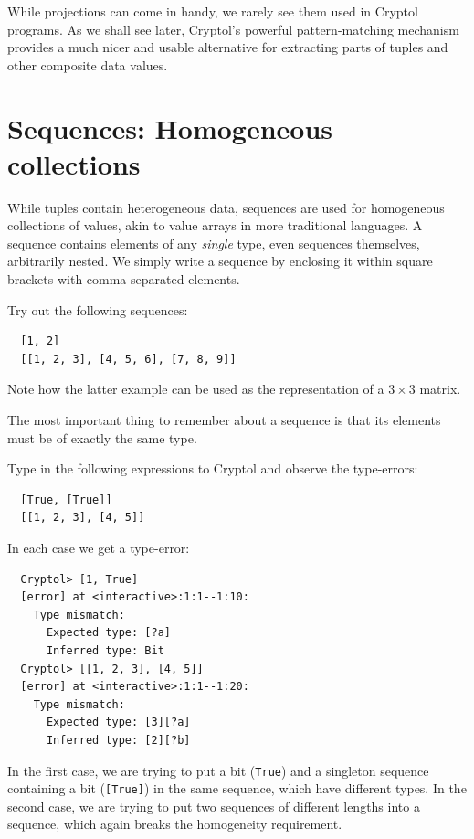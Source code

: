 \begin{tip}
  While projections can come in handy, we rarely see them used in
  Cryptol programs. As we shall see later, Cryptol's powerful
  pattern-matching mechanism provides a much nicer and usable
  alternative for extracting parts of tuples and other composite data
  values.
\end{tip}

\section{Sequences: Homogeneous collections}
\label{sec:sequences}

While tuples contain heterogeneous data, sequences are used for
homogeneous collections of values, akin to value arrays in more
traditional languages.  A sequence contains elements of any
\emph{single} type, even sequences themselves, arbitrarily nested.  We
simply write a sequence by enclosing it within square brackets with
comma-separated elements.\indTheSequenceType

\begin{Exercise}\label{ex:seq:1}
Try out the following sequences:
\begin{Verbatim}
  [1, 2]
  [[1, 2, 3], [4, 5, 6], [7, 8, 9]]
\end{Verbatim}
Note how the latter example can be used as the representation of a
$3\times3$ matrix.
\end{Exercise}

\begin{tip}
  The most important thing to remember about a sequence is that its
  elements must be of exactly the same type.
\end{tip}

\begin{Exercise}\label{ex:seq:2}
  Type in the following expressions to Cryptol and observe the
  type-errors:
\begin{Verbatim}
  [True, [True]]
  [[1, 2, 3], [4, 5]]
\end{Verbatim}
\end{Exercise}
\begin{Answer}
In each case we get a type-error:
\begin{Verbatim}
  Cryptol> [1, True]
  [error] at <interactive>:1:1--1:10:
    Type mismatch:
      Expected type: [?a]
      Inferred type: Bit
  Cryptol> [[1, 2, 3], [4, 5]]
  [error] at <interactive>:1:1--1:20:
    Type mismatch:
      Expected type: [3][?a]
      Inferred type: [2][?b]
\end{Verbatim}
In the first case, we are trying to put a bit ({\tt True}) and a
singleton sequence containing a bit ({\tt [True]}) in the same
sequence, which have different types. In the second case, we are
trying to put two sequences of different lengths into a sequence,
which again breaks the homogeneity requirement.
\end{Answer}

